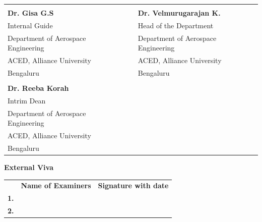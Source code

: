 \documentclass[12pt]{article}
\begin{document}
\begin{center}
\begin{tabular}{K{7cm} K{0.5cm} K{7cm}}
\underline{\hspace{2.5cm}} & & \underline{\hspace{4cm}} \\ 
\textbf{Dr. Gisa G.S} & & \textbf{Dr. Velmurugarajan K.} \vspace{1em}\\ 
Internal Guide & & Head of the Department \\ 
Department of Aerospace Engineering & & Department of Aerospace Engineering \\
ACED, Alliance University & & ACED, Alliance University \\ 
Bengaluru & & Bengaluru \vspace{2em}\\ 
\underline{\hspace{3cm}} & &  \\ 
\textbf{Dr. Reeba Korah} & &  \\ \vspace{0.5em}
Intrim Dean & &  \\ 
Department of Aerospace Engineering & & \\
ACED, Alliance University & &  \\ 
Bengaluru & &  \vspace{2em}\\ 
\end{tabular} 
\end{center}
\textbf{External Viva}
\begin{center}
\begin{tabular}{c K{7cm} K{7cm}}
 & \textbf{Name of Examiners} & \textbf{Signature with date} \\
\textbf{1.} & & \\
\textbf{2.} & & \\
\end{tabular}
\end{center}
\thispagestyle{empty}
\newpage






















%	
%
\end{document}
